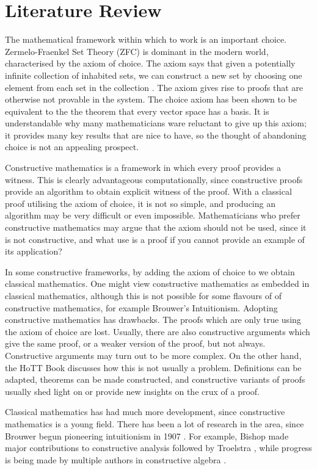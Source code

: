 \documentclass[ProjectReport]{subfiles}
\begin{document}
\section{Literature Review}
The mathematical framework within which to work is an important choice. Zermelo-Fraenkel Set Theory (ZFC) is dominant in the modern world, characterised by the axiom of choice. The axiom says that given a potentially infinite collection of inhabited sets, we can construct a new set by choosing one element from each set in the collection \cite{choiceaxiom}. The axiom gives rise to proofs that are otherwise not provable in the system. The choice axiom has been shown to be equivalent to the the theorem that every vector space has a basis. It is understandable why many mathematicians ware reluctant to give up this axiom; it provides many key results that are nice to have, so the thought of abandoning choice is not an appealing prospect. 

Constructive mathematics is a framework in which every proof provides a witness. This is clearly advantageous computationally, since constructive proofs provide an algorithm to obtain explicit witness of the proof. With a classical proof utilising the axiom of choice, it is not so simple, and producing an algorithm may be very difficult or even impossible. Mathematicians who prefer constructive mathematics may argue that the axiom should not be used, since it is not constructive, and what use is a proof if you cannot provide an example of its application? 

In some constructive frameworks, by adding the axiom of choice to we obtain classical mathematics. One might view constructive mathematics as embedded in classical mathematics, although this is not possible for some flavours of of constructive mathematics, for example Brouwer's Intuitionism. Adopting constructive mathematics has drawbacks. The proofs which are only true using the axiom of choice are lost. Usually, there are also constructive arguments which give the same proof, or a weaker version of the proof, but not always. Constructive arguments may turn out to be more complex. On the other hand, the HoTT Book \cite[Introduction - Constructivity]{hottbook} discusses how this is not usually a problem. Definitions can be adapted, theorems can be made constructed, and constructive variants of proofs usually shed light on or provide new insights on the crux of a proof.

Classical mathematics has had much more development, since constructive mathematics is a young field. There has been a lot of research in the area, since Brouwer begun pioneering intuitionism in 1907 \cite{Brouwer}. For example, Bishop made major contributions to constructive analysis \cite{Bishop1987-BISCA-2} followed by Troelstra \cite{Troelstra1973-TROMIO}, while progress is being made by multiple authors in constructive algebra \cite{2015}. 
\end{document}
